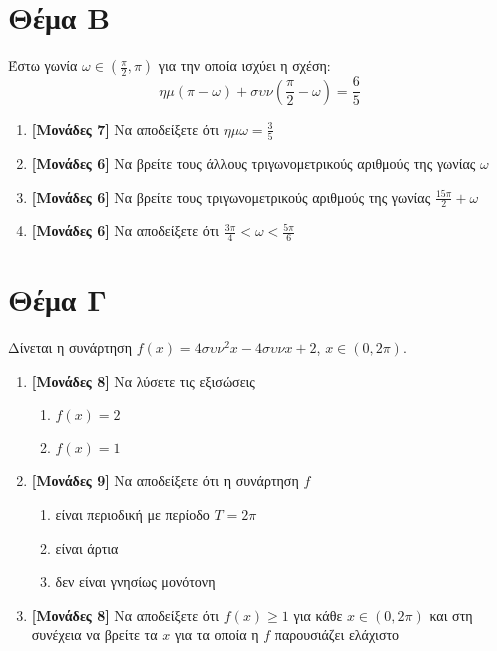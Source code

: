 \documentclass[12pt]{article}
\begin{document}
\section*{Θέμα Β}
\noindent
Έστω γωνία $ω\in\left( \frac{π}{2},π \right)$ για την οποία ισχύει η σχέση:
$$ημ(π-ω)+συν(\frac{π}{2}-ω)=\frac{6}{5}$$
\begin{enumerate}
 \item \textbf{[Μονάδες 7]} Να αποδείξετε ότι $ημω=\frac{3}{5}$
 \item \textbf{[Μονάδες 6]} Να βρείτε τους άλλους τριγωνομετρικούς αριθμούς της γωνίας $ω$
 \item \textbf{[Μονάδες 6]} Να βρείτε τους τριγωνομετρικούς αριθμούς της γωνίας $\frac{15π}{2}+ω$
 \item \textbf{[Μονάδες 6]} Να αποδείξετε ότι $\frac{3π}{4}<ω<\frac{5π}{6}$
\end{enumerate}

\section*{Θέμα Γ}
\noindent
Δίνεται η συνάρτηση $f(x)=4συν^2x-4συνx+2$, $x\in (0,2π)$.
\begin{enumerate}
 \item \textbf{[Μονάδες 8]} Να λύσετε τις εξισώσεις
       \begin{multicols}{2}
        \begin{enumerate}[label=(\roman*).]
         \item $f(x)=2$
         \item $f(x)=1$
        \end{enumerate}
       \end{multicols}
 \item \textbf{[Μονάδες 9]} Να αποδείξετε ότι η συνάρτηση $f$
       \begin{enumerate}[label=\roman*.]
        \item είναι περιοδική με περίοδο $Τ=2π$
        \item είναι άρτια
        \item δεν είναι γνησίως μονότονη
       \end{enumerate}
 \item \textbf{[Μονάδες 8]} Να αποδείξετε ότι $f(x)\ge 1$ για κάθε $x\in (0,2π)$ και στη συνέχεια να βρείτε τα $x$ για τα οποία η $f$ παρουσιάζει ελάχιστο
\end{enumerate}
\end{document}
